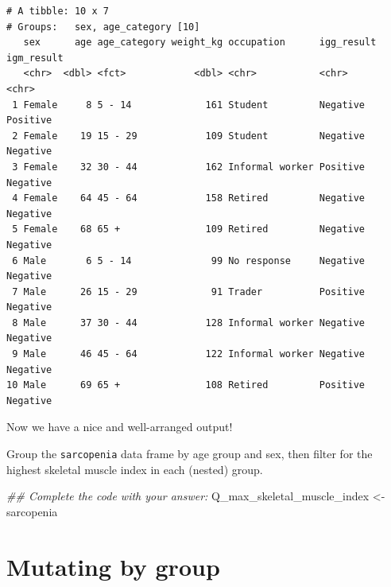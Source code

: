 \documentclass[
  letterpaper,
  DIV=11,
  numbers=noendperiod]{scrreprt}
\newenvironment{Shaded}{\begin{snugshade}}{\end{snugshade}}
\newcommand{\DocumentationTok}[1]{\textcolor[rgb]{0.37,0.37,0.37}{\textit{#1}}}
\newcommand{\NormalTok}[1]{\textcolor[rgb]{0.00,0.23,0.31}{#1}}
\newcommand{\OtherTok}[1]{\textcolor[rgb]{0.00,0.23,0.31}{#1}}
\begin{document}
\begin{verbatim}
# A tibble: 10 x 7
# Groups:   sex, age_category [10]
   sex      age age_category weight_kg occupation      igg_result igm_result
   <chr>  <dbl> <fct>            <dbl> <chr>           <chr>      <chr>     
 1 Female     8 5 - 14             161 Student         Negative   Positive  
 2 Female    19 15 - 29            109 Student         Negative   Negative  
 3 Female    32 30 - 44            162 Informal worker Positive   Negative  
 4 Female    64 45 - 64            158 Retired         Negative   Negative  
 5 Female    68 65 +               109 Retired         Negative   Negative  
 6 Male       6 5 - 14              99 No response     Negative   Negative  
 7 Male      26 15 - 29             91 Trader          Positive   Negative  
 8 Male      37 30 - 44            128 Informal worker Negative   Negative  
 9 Male      46 45 - 64            122 Informal worker Negative   Negative  
10 Male      69 65 +               108 Retired         Positive   Negative  
\end{verbatim}

Now we have a nice and well-arranged output!

\begin{tcolorbox}[enhanced jigsaw, title=\textcolor{quarto-callout-tip-color}{\faLightbulb}\hspace{0.5em}{Practice}, colbacktitle=quarto-callout-tip-color!10!white, leftrule=.75mm, arc=.35mm, opacityback=0, bottomrule=.15mm, rightrule=.15mm, toptitle=1mm, breakable, toprule=.15mm, colback=white, coltitle=black, colframe=quarto-callout-tip-color-frame, bottomtitle=1mm, titlerule=0mm, left=2mm, opacitybacktitle=0.6]

Group the \texttt{sarcopenia} data frame by age group and sex, then
filter for the highest skeletal muscle index in each (nested) group.

\begin{Shaded}
\begin{Highlighting}[]
\DocumentationTok{\#\# Complete the code with your answer:}
\NormalTok{Q\_max\_skeletal\_muscle\_index }\OtherTok{\textless{}{-}} 
\NormalTok{  sarcopenia }
\end{Highlighting}
\end{Shaded}

\end{tcolorbox}

\section{Mutating by group}\label{mutating-by-group}
\end{document}
